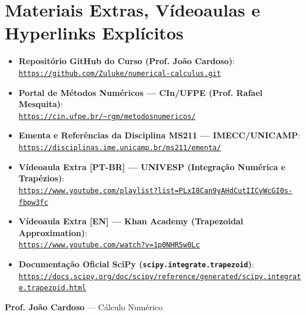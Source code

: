 \documentclass[11pt,a4paper]{article}
\begin{document}
\section{Materiais Extras, Vídeoaulas e Hyperlinks Explícitos}

\begin{itemize}[leftmargin=1.4em]\small
    \item \textbf{Repositório GitHub do Curso (Prof. João Cardoso)}: \\
    \href{https://github.com/Zuluke/numerical-calculus.git}{\nolinkurl{https://github.com/Zuluke/numerical-calculus.git}} \cite{cardoso2026_github}
    \item \textbf{Portal de Métodos Numéricos --- CIn/UFPE (Prof. Rafael Mesquita)}: \\
    \href{https://cin.ufpe.br/~rgm/metodosnumericos/}{\nolinkurl{https://cin.ufpe.br/~rgm/metodosnumericos/}} \cite{mesquita2026}
    \item \textbf{Ementa e Referências da Disciplina MS211 --- IMECC/UNICAMP}: \\
    \href{https://disciplinas.ime.unicamp.br/ms211/ementa/}{\nolinkurl{https://disciplinas.ime.unicamp.br/ms211/ementa/}} \cite{unicamp_ms211}
    \item \textbf{Vídeoaula Extra [PT-BR] --- UNIVESP (Integração Numérica e Trapézios)}: \\
    \href{https://www.youtube.com/playlist?list=PLxI8Can9yAHdCutIICyWcGI0s-fbpw3fc}{\nolinkurl{https://www.youtube.com/playlist?list=PLxI8Can9yAHdCutIICyWcGI0s-fbpw3fc}} \cite{univesp_video}
    \item \textbf{Vídeoaula Extra [EN] --- Khan Academy (Trapezoidal Approximation)}: \\
    \href{https://www.youtube.com/watch?v=1p0NHR5w0Lc}{\nolinkurl{https://www.youtube.com/watch?v=1p0NHR5w0Lc}} \cite{khan_trapezoid_video}
    \item \textbf{Documentação Oficial SciPy (\texttt{scipy.integrate.trapezoid})}: \\
    \href{https://docs.scipy.org/doc/scipy/reference/generated/scipy.integrate.trapezoid.html}{\nolinkurl{https://docs.scipy.org/doc/scipy/reference/generated/scipy.integrate.trapezoid.html}} \cite{scipy_trapezoid}
\end{itemize}

\nocite{*}
\printbibliography[title={Referências Bibliográficas}]

\vspace{0.8cm}
\begin{flushright}
\textbf{Prof. João Cardoso} --- Cálculo Numérico
\end{flushright}
\end{document}
